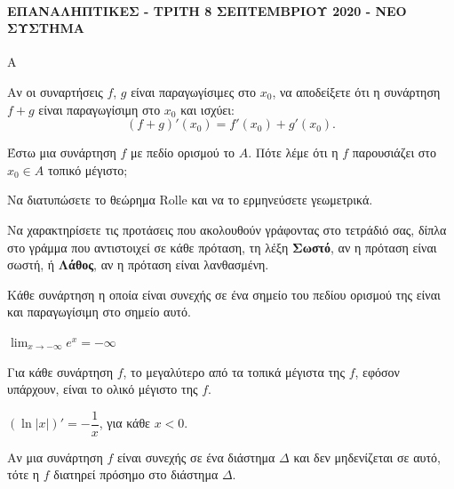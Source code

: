 \paragraph{ΕΠΑΝΑΛΗΠΤΙΚΕΣ - ΤΡΙΤΗ 8 ΣΕΠΤΕΜΒΡΙΟΥ 2020 - ΝΕΟ ΣΥΣΤΗΜΑ}
\begin{thema}{Α}
\begin{erwthma}
    \item Αν οι συναρτήσεις $f$, $g$ είναι παραγωγίσιμες στο $x_0$, να αποδείξετε ότι η συνάρτηση $f+g$ είναι παραγωγίσιμη στο $x_0$ και ισχύει:
    \[
    (f+g)'(x_0) = f'(x_0) + g'(x_0).
    \]

    \item Έστω μια συνάρτηση $f$ με πεδίο ορισμού το $A$. Πότε λέμε ότι η $f$ παρουσιάζει στο $x_0 \in A$ τοπικό μέγιστο; 

    \item Να διατυπώσετε το θεώρημα Rolle και να το ερμηνεύσετε γεωμετρικά. 

    \item Να χαρακτηρίσετε τις προτάσεις που ακολουθούν γράφοντας στο τετράδιό σας, δίπλα στο γράμμα που αντιστοιχεί σε κάθε πρόταση, τη λέξη \textbf{Σωστό}, αν η πρόταση είναι σωστή, ή \textbf{Λάθος}, αν η πρόταση είναι λανθασμένη.
    \begin{alist}
        \item Κάθε συνάρτηση η οποία είναι συνεχής σε ένα σημείο του πεδίου ορισμού της είναι και παραγωγίσιμη στο σημείο αυτό.
        \item $\displaystyle\lim_{x \to -\infty} e^x = -\infty$
        \item Για κάθε συνάρτηση $f$, το μεγαλύτερο από τα τοπικά μέγιστα της $f$, εφόσον υπάρχουν, είναι το ολικό μέγιστο της $f$.
        \item $(\ln|x|)' = -\dfrac{1}{x}$, για κάθε $x < 0$.
        \item Αν μια συνάρτηση $f$ είναι συνεχής σε ένα διάστημα $\Delta$ και δεν μηδενίζεται σε αυτό, τότε η $f$ διατηρεί πρόσημο στο διάστημα $\Delta$.
    \end{alist}
\end{erwthma}
\end{thema}

